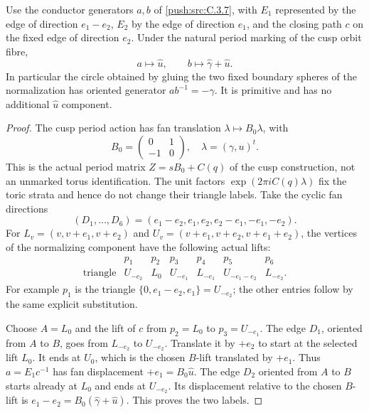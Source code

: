 \begin{lemma}\label{push:src:C.3.9}
Use the conductor generators \(a,b\) of \ref{push:src:C.3.7}, with
\(E_1\) represented by the edge of direction \(e_1-e_2\),
\(E_2\) by the edge of direction \(e_1\), and the closing path
\(c\) on the fixed edge of direction \(e_2\). Under the
natural period marking of the cusp orbit fibre,
\[
 a\longmapsto\widehat u,\qquad
 b\longmapsto\widehat\gamma+\widehat u.
\]
In particular the circle obtained by gluing the two fixed boundary
spheres of the normalization has oriented generator
\(ab^{-1}=-\widehat\gamma\). It is primitive and has no
additional \(\widehat u\) component.
\end{lemma}

\begin{proof}
The cusp period action has fan translation
\(\lambda\mapsto B_0\lambda\), with
\[
 B_0=\begin{pmatrix}0&1\\-1&0\end{pmatrix},
 \quad \lambda=(\gamma,u)^t.
\]
This is the actual period matrix
\(Z=sB_0+C(q)\) of the cusp construction, not an unmarked
torus identification. The unit factors \(\exp(2\pi i C(q)\lambda)\)
fix the toric strata and hence do not change their triangle labels.
Take the cyclic fan directions
\[
 (D_1,\ldots,D_6)=
 (e_1-e_2,e_1,e_2,e_2-e_1,-e_1,-e_2).
\]
For \(L_v=(v,v+e_1,v+e_2)\) and
\(U_v=(v+e_1,v+e_2,v+e_1+e_2)\), the vertices of the
normalizing component have the following actual lifts:
\[
 \begin{array}{c|cccccc}
 &p_1&p_2&p_3&p_4&p_5&p_6\\\hline
 \text{triangle}&U_{-e_2}&L_0&U_{-e_1}&L_{-e_1}
                 &U_{-e_1-e_2}&L_{-e_2}.
 \end{array}
\]
For example \(p_1\) is the triangle
\(\{0,e_1-e_2,e_1\}=U_{-e_2}\); the other entries follow
by the same explicit substitution.

Choose \(A=L_0\) and the lift of \(c\) from
\(p_2=L_0\) to \(p_3=U_{-e_1}\).
The edge \(D_1\), oriented from \(A\) to \(B\), goes
from \(L_{-e_2}\) to \(U_{-e_2}\). Translate it by
\(+e_2\) to start at the selected lift \(L_0\).
It ends at \(U_0\), which is the chosen \(B\)-lift
translated by \(+e_1\). Thus \(a=E_1c^{-1}\) has
fan displacement \(+e_1=B_0\widehat u\).
The edge \(D_2\) oriented from \(A\) to \(B\)
starts already at \(L_0\) and ends at \(U_{-e_2}\).
Its displacement relative to the chosen \(B\)-lift is
\(e_1-e_2=B_0(\widehat\gamma+\widehat u)\).
This proves the two labels.


\end{proof}
